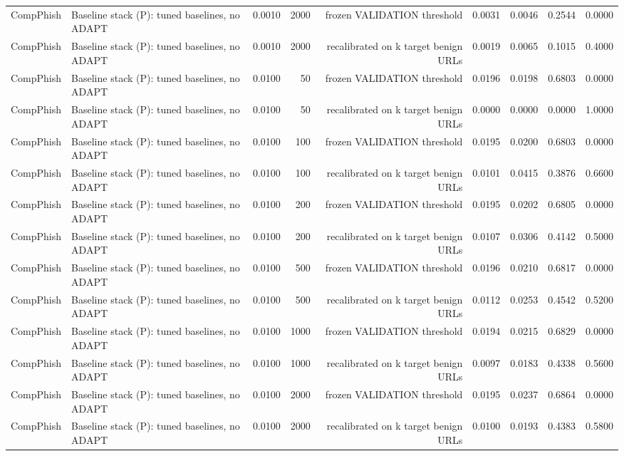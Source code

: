 \begin{table}[t]
\begin{tabular}{llrrrrrrr}
CompPhish & Baseline stack (P): tuned baselines, no ADAPT & 0.0010 & 2000 & frozen VALIDATION threshold & 0.0031 & 0.0046 & 0.2544 & 0.0000 \\
CompPhish & Baseline stack (P): tuned baselines, no ADAPT & 0.0010 & 2000 & recalibrated on k target benign URLs & 0.0019 & 0.0065 & 0.1015 & 0.4000 \\
CompPhish & Baseline stack (P): tuned baselines, no ADAPT & 0.0100 & 50 & frozen VALIDATION threshold & 0.0196 & 0.0198 & 0.6803 & 0.0000 \\
CompPhish & Baseline stack (P): tuned baselines, no ADAPT & 0.0100 & 50 & recalibrated on k target benign URLs & 0.0000 & 0.0000 & 0.0000 & 1.0000 \\
CompPhish & Baseline stack (P): tuned baselines, no ADAPT & 0.0100 & 100 & frozen VALIDATION threshold & 0.0195 & 0.0200 & 0.6803 & 0.0000 \\
CompPhish & Baseline stack (P): tuned baselines, no ADAPT & 0.0100 & 100 & recalibrated on k target benign URLs & 0.0101 & 0.0415 & 0.3876 & 0.6600 \\
CompPhish & Baseline stack (P): tuned baselines, no ADAPT & 0.0100 & 200 & frozen VALIDATION threshold & 0.0195 & 0.0202 & 0.6805 & 0.0000 \\
CompPhish & Baseline stack (P): tuned baselines, no ADAPT & 0.0100 & 200 & recalibrated on k target benign URLs & 0.0107 & 0.0306 & 0.4142 & 0.5000 \\
CompPhish & Baseline stack (P): tuned baselines, no ADAPT & 0.0100 & 500 & frozen VALIDATION threshold & 0.0196 & 0.0210 & 0.6817 & 0.0000 \\
CompPhish & Baseline stack (P): tuned baselines, no ADAPT & 0.0100 & 500 & recalibrated on k target benign URLs & 0.0112 & 0.0253 & 0.4542 & 0.5200 \\
CompPhish & Baseline stack (P): tuned baselines, no ADAPT & 0.0100 & 1000 & frozen VALIDATION threshold & 0.0194 & 0.0215 & 0.6829 & 0.0000 \\
CompPhish & Baseline stack (P): tuned baselines, no ADAPT & 0.0100 & 1000 & recalibrated on k target benign URLs & 0.0097 & 0.0183 & 0.4338 & 0.5600 \\
CompPhish & Baseline stack (P): tuned baselines, no ADAPT & 0.0100 & 2000 & frozen VALIDATION threshold & 0.0195 & 0.0237 & 0.6864 & 0.0000 \\
CompPhish & Baseline stack (P): tuned baselines, no ADAPT & 0.0100 & 2000 & recalibrated on k target benign URLs & 0.0100 & 0.0193 & 0.4383 & 0.5800 \\

\end{tabular}
\end{table}
